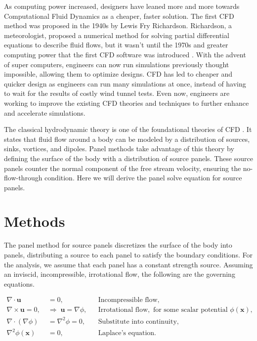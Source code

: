 \documentclass[conf]{new-aiaa} %
\begin{document}
As computing power increased, designers have leaned more and more towards Computational Fluid Dynamics as a cheaper, faster solution.
The first CFD method was proposed in the 1940s by Lewis Fry Richardson. 
Richardson, a meteorologist, proposed a numerical method for solving partial differential equations to describe fluid flows, but it wasn't until the 1970s and greater computing power that the first CFD software was introduced \cite{resolved_cfd_history}.
With the advent of super computers, engineers can now run simulations previously thought impossible, allowing them to optimize designs.
CFD has led to cheaper and quicker design as engineers can run many simulations at once, instead of having to wait for the results of costly wind tunnel tests.
Even now, engineers are working to improve the existing CFD theories and techniques to further enhance and accelerate simulations.

The classical hydrodynamic theory is one of the foundational theories of CFD \cite{sciencedirect_vortex}. 
It states that fluid flow around a body can be modeled by a distribution of sources, sinks, vortices, and dipoles.
Panel methods take advantage of this theory by defining the surface of the body with a distribution of source panels.
These source panels counter the normal component of the free stream velocity, ensuring the no-flow-through condition.
Here we will derive the panel solve equation for source panels.

\section{Methods}
The panel method for source panels discretizes the surface of the body into panels, distributing a source to each panel to satisfy the boundary conditions.
For the analysis, we assume that each panel has a constant strength source.
Assuming an inviscid, incompressible, irrotational flow, the following are the governing equations.

\begin{align}
\nabla \cdot \mathbf{u} &= 0, 
&& \text{Incompressible flow}, \\
\nabla \times \mathbf{u} = 0, \; &\Rightarrow \; \mathbf{u} = \nabla \phi,
&& \text{Irrotational flow}, \text{ for some scalar potential $\phi(\mathbf{x})$}, \\
\nabla \cdot (\nabla \phi) &= \nabla^2 \phi = 0, 
&& \text{Substitute into continuity,} \\
\nabla^2 \phi(\mathbf{x}) &= 0, 
&& \text{Laplace's equation}.
\label{eq:basics}
\end{align}
\end{document}
